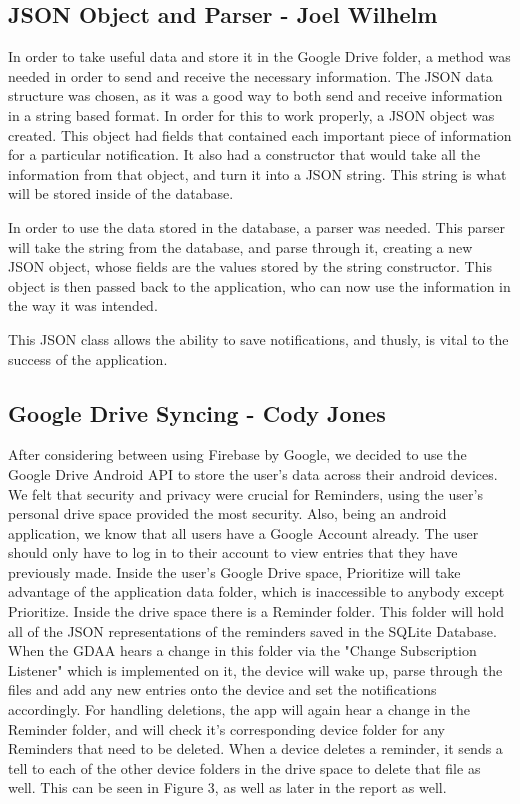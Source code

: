 \documentclass[12pt]{article}
\begin{document}
\subsection{JSON Object and Parser - Joel Wilhelm}
In order to take useful data and store it in the Google Drive folder, a method was needed in order to send and receive the necessary information. The JSON data structure was chosen, as it was a good way to both send and receive information in a string based format. In order for this to work properly, a JSON object was created. This object had fields that contained each important piece of information for a particular notification. It also had a constructor that would take all the information from that object, and turn it into a JSON string. This string is what will be stored inside of the database.

In order to use the data stored in the database, a parser was needed. This parser will take the string from the database, and parse through it, creating a new JSON object, whose fields are the values stored by the string constructor. This object is then passed back to the application, who can now use the information in the way it was intended. 

This JSON class allows the ability to save notifications, and thusly, is vital to the success of the application. 


\subsection{Google Drive Syncing - Cody Jones}
After considering between using Firebase by Google, we decided to use the Google Drive Android API to store the user's data across their android devices. We felt that security and privacy were crucial for Reminders, using the user's personal drive space provided the most security. Also, being an android application, we know that all users have a Google Account already. The user should only have to log in to their account to view entries that they have previously made. Inside the user's Google Drive space, Prioritize will take advantage of the application data folder, which is inaccessible to anybody except Prioritize. Inside the drive space there is a Reminder folder. This folder will hold all of the JSON representations of the reminders saved in the SQLite Database. When the GDAA hears a change in this folder via the "Change Subscription Listener" which is implemented on it, the device will wake up, parse through the files and add any new entries onto the device and set the notifications accordingly. For handling deletions, the app will again hear a change in the Reminder folder, and will check it's corresponding device folder for any Reminders that need to be deleted. When a device deletes a reminder, it sends a tell to each of the other device folders in the drive space to delete that file as well. This can be seen in Figure 3, as well as later in the  report as well.
\end{document}
